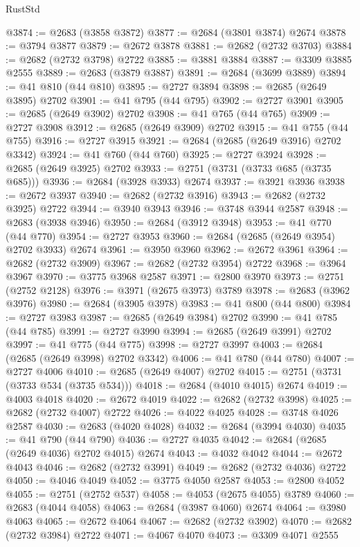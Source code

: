 \begin{lexlean}{RustStd}
\begin{coremodule}
@3874 := @2683 (@3858 @3872)
@3877 := @2684 (@3801 @3874) @2674
@3878 := @3794 @3877
@3879 := @2672 @3878
@3881 := @2682 (@2732 @3703)
@3884 := @2682 (@2732 @3798) @2722
@3885 := @3881 @3884
@3887 := @3309 @3885 @2555
@3889 := @2683 (@3879 @3887)
@3891 := @2684 (@3699 @3889)
@3894 := @41 @810 (@44 @810)
@3895 := @2727 @3894
@3898 := @2685 (@2649 @3895) @2702
@3901 := @41 @795 (@44 @795)
@3902 := @2727 @3901
@3905 := @2685 (@2649 @3902) @2702
@3908 := @41 @765 (@44 @765)
@3909 := @2727 @3908
@3912 := @2685 (@2649 @3909) @2702
@3915 := @41 @755 (@44 @755)
@3916 := @2727 @3915
@3921 := @2684 (@2685 (@2649 @3916) @2702 @3342)
@3924 := @41 @760 (@44 @760)
@3925 := @2727 @3924
@3928 := @2685 (@2649 @3925) @2702
@3933 := @2751 (@3731 (@3733 @685 (@3735 @685)))
@3936 := @2684 (@3928 @3933) @2674
@3937 := @3921 @3936
@3938 := @2672 @3937
@3940 := @2682 (@2732 @3916)
@3943 := @2682 (@2732 @3925) @2722
@3944 := @3940 @3943
@3946 := @3748 @3944 @2587
@3948 := @2683 (@3938 @3946)
@3950 := @2684 (@3912 @3948)
@3953 := @41 @770 (@44 @770)
@3954 := @2727 @3953
@3960 := @2684 (@2685 (@2649 @3954) @2702 @3933) @2674
@3961 := @3950 @3960
@3962 := @2672 @3961
@3964 := @2682 (@2732 @3909)
@3967 := @2682 (@2732 @3954) @2722
@3968 := @3964 @3967
@3970 := @3775 @3968 @2587
@3971 := @2800 @3970
@3973 := @2751 (@2752 @2128)
@3976 := @3971 (@2675 @3973) @3789
@3978 := @2683 (@3962 @3976)
@3980 := @2684 (@3905 @3978)
@3983 := @41 @800 (@44 @800)
@3984 := @2727 @3983
@3987 := @2685 (@2649 @3984) @2702
@3990 := @41 @785 (@44 @785)
@3991 := @2727 @3990
@3994 := @2685 (@2649 @3991) @2702
@3997 := @41 @775 (@44 @775)
@3998 := @2727 @3997
@4003 := @2684 (@2685 (@2649 @3998) @2702 @3342)
@4006 := @41 @780 (@44 @780)
@4007 := @2727 @4006
@4010 := @2685 (@2649 @4007) @2702
@4015 := @2751 (@3731 (@3733 @534 (@3735 @534)))
@4018 := @2684 (@4010 @4015) @2674
@4019 := @4003 @4018
@4020 := @2672 @4019
@4022 := @2682 (@2732 @3998)
@4025 := @2682 (@2732 @4007) @2722
@4026 := @4022 @4025
@4028 := @3748 @4026 @2587
@4030 := @2683 (@4020 @4028)
@4032 := @2684 (@3994 @4030)
@4035 := @41 @790 (@44 @790)
@4036 := @2727 @4035
@4042 := @2684 (@2685 (@2649 @4036) @2702 @4015) @2674
@4043 := @4032 @4042
@4044 := @2672 @4043
@4046 := @2682 (@2732 @3991)
@4049 := @2682 (@2732 @4036) @2722
@4050 := @4046 @4049
@4052 := @3775 @4050 @2587
@4053 := @2800 @4052
@4055 := @2751 (@2752 @537)
@4058 := @4053 (@2675 @4055) @3789
@4060 := @2683 (@4044 @4058)
@4063 := @2684 (@3987 @4060) @2674
@4064 := @3980 @4063
@4065 := @2672 @4064
@4067 := @2682 (@2732 @3902)
@4070 := @2682 (@2732 @3984) @2722
@4071 := @4067 @4070
@4073 := @3309 @4071 @2555

\end{coremodule}
\end{lexlean}
